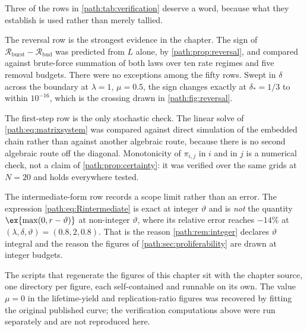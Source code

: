 Three of the rows in \cref{path:tab:verification} deserve a word, because
what they establish is used rather than merely tallied.

The reversal row is the strongest evidence in the chapter. The sign of
$\mathcal{R}_{\mathrm{burst}}-\mathcal{R}_{\mathrm{bud}}$ was predicted from
$L$ alone, by \cref{path:prop:reversal}, and compared against brute-force
summation of both laws over ten rate regimes and five removal budgets. There
were no exceptions among the fifty rows. Swept in $\delta$ across the
boundary at $\lambda=1$, $\mu=0.5$, the sign changes exactly at
$\delta_{*}=1/3$ to within $10^{-16}$, which is the crossing drawn in
\cref{path:fig:reversal}.

The first-step row is the only stochastic check. The linear solve of
\cref{path:eq:matrixsystem} was compared against direct simulation of the
embedded chain rather than against another algebraic route, because there is
no second algebraic route off the diagonal. Monotonicity of $\pi_{i,j}$ in
$i$ and in $j$ is a numerical check, not a claim of
\cref{path:prop:certainty}: it was verified over the same grids at $N=20$
and holds everywhere tested.

The intermediate-form row records a scope limit rather than an error. The
expression \cref{path:eq:Rintermediate} is exact at integer $\vartheta$ and
is \emph{not} the quantity $\ex{\max(0,r-\vartheta)}$ at non-integer
$\vartheta$, where its relative error reaches $-14\%$ at
$(\lambda,\delta,\vartheta)=(0.8,2,0.8)$. That is the reason
\cref{path:rem:integer} declares $\vartheta$ integral and the reason the
figures of \cref{path:sec:proliferability} are drawn at integer budgets.

The scripts that regenerate the figures of this chapter sit with the chapter
source, one directory per figure, each self-contained and runnable on its
own. The value $\mu=0$ in the lifetime-yield and replication-ratio figures
was recovered by fitting the original published curve; the verification
computations above were run separately and are not reproduced here.

\FloatBarrier
